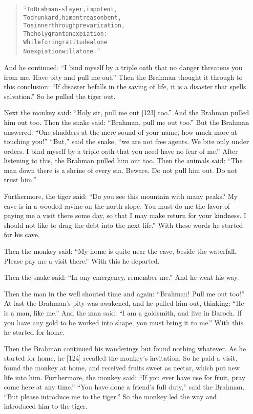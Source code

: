 \documentclass[article, twoside, 14pt]{memoir}
\renewenvironment{verbatim}{%
\begin{quote}%
\vskip -10pt%
\begin{alltt}\normalfont\large}{\end{alltt}%
\end{quote}%
\vskip -10pt
} %
\begin{document}
\begin{verbatim}
“To Brahman-slayer, impotent,
To drunkard, him on treason bent,
To sinner through prevarication,
The holy grant an expiation:
While for ingratitude alone
No expiation will atone.”
\end{verbatim}
And he continued:
``I bind myself by a triple oath that no danger threatens you from me. Have pity and pull me out.''
Then the Brahman thought it through to this conclusion:
``If disaster befalls in the saving of life, it is a disaster that spells salvation.''
So he pulled the tiger out.

Next the monkey said: ``Holy sir, pull me out [123] too.'' And the
Brahman pulled him out too. Then the snake said:
``Brahman, pull me out too.'' But the Brahman answered:
``One shudders at the mere sound of your name, how much more at touching you!''
``But,'' said the snake,
``we are not free agents. We bite only under orders. I bind myself by a triple oath that you need have no fear of me.''
After listening to this, the Brahman pulled him out too. Then the
animals said:
``The man down there is a shrine of every sin. Beware. Do not pull him out. Do not trust him.''

Furthermore, the tiger said:
``Do you see this mountain with many peaks? My cave is in a wooded ravine on the north slope. You must do me the favor of paying me a visit there some day, so that I may make return for your kindness. I should not like to drag the debt into the next life.''
With these words he started for his cave.

Then the monkey said:
``My home is quite near the cave, beside the waterfall. Please pay me a visit there.''
With this he departed.

Then the snake said: ``In any emergency, remember me.'' And he went
his way.

Then the man in the well shouted time and again:
``Brahman! Pull me out too!'' At last the Brahman's pity was
awakened, and he pulled him out, thinking:
``He is a man, like me.'' And the man said:
``I am a goldsmith, and live in Baroch. If you have any gold to be worked into shape, you must bring it to me.''
With this he started for home.

Then the Brahman continued his wanderings but found nothing
whatever. As he started for home, he [124] recalled the monkey's
invitation. So he paid a visit, found the monkey at home, and
received fruits sweet as nectar, which put new life into him.
Furthermore, the monkey said:
``If you ever have use for fruit, pray come here at any time.''
``You have done a friend's full duty,'' said the Brahman.
``But please introduce me to the tiger.'' So the monkey led the way
and introduced him to the tiger.
\end{document}
